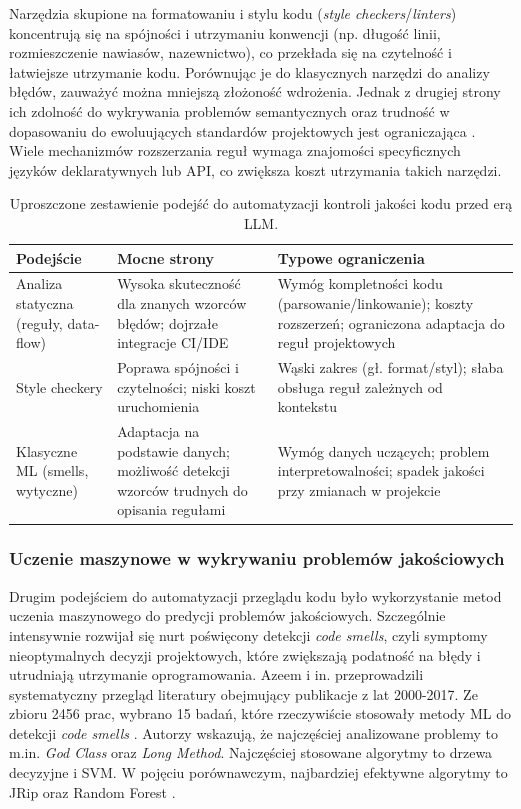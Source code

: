 Narzędzia skupione na formatowaniu i stylu kodu (\textit{style checkers}/\textit{linters}) koncentrują się na
spójności i utrzymaniu konwencji (np. długość linii, rozmieszczenie nawiasów, nazewnictwo), co przekłada się na
czytelność i łatwiejsze utrzymanie kodu. Porównując je do klasycznych narzędzi do analizy błędów, zauważyć można mniejszą
złożoność wdrożenia. Jednak z drugiej strony ich zdolność do wykrywania problemów semantycznych oraz trudność w dopasowaniu
do ewoluujących standardów projektowych jest ograniczająca \cite{Ochodek2020}. Wiele mechanizmów rozszerzania
reguł wymaga znajomości specyficznych języków deklaratywnych lub API, co zwiększa koszt utrzymania takich narzędzi.

\begin{table}[h]
\centering
\caption{Uproszczone zestawienie podejść do automatyzacji kontroli jakości kodu przed erą LLM.}
\label{tab:przed_llm_podejscia}
\begin{tabular}{p{3.4cm} p{5.2cm} p{5.2cm}}
\hline
\textbf{Podejście} & \textbf{Mocne strony} & \textbf{Typowe ograniczenia} \\
\hline
Analiza statyczna (reguły, data-flow) & Wysoka skuteczność dla znanych wzorców błędów; dojrzałe integracje CI/IDE
& Wymóg kompletności kodu (parsowanie/linkowanie); koszty rozszerzeń; ograniczona adaptacja do reguł projektowych \\
\hline
Style checkery & Poprawa spójności i czytelności; niski koszt uruchomienia & Wąski zakres (gł. format/styl);
słaba obsługa reguł zależnych od kontekstu \\
\hline
Klasyczne ML (smells, wytyczne) & Adaptacja na podstawie danych; możliwość detekcji wzorców trudnych do opisania
regułami & Wymóg danych uczących; problem interpretowalności; spadek jakości przy zmianach w projekcie \\
\hline
\end{tabular}
\end{table}

\subsubsection{Uczenie maszynowe w wykrywaniu problemów jakościowych}
Drugim podejściem do automatyzacji przeglądu kodu było wykorzystanie metod uczenia maszynowego do predycji problemów
jakościowych. Szczególnie intensywnie rozwijał się nurt poświęcony detekcji \textit{code smells}, czyli symptomy
nieoptymalnych decyzji projektowych, które zwiększają podatność na błędy i utrudniają utrzymanie oprogramowania.
Azeem i in. przeprowadzili systematyczny przegląd literatury obejmujący publikacje z lat 2000-2017.
Ze zbioru 2456 prac, wybrano 15 badań, które rzeczywiście stosowały metody ML do detekcji \textit{code smells} \cite{Azeem2019}.
Autorzy wskazują, że najczęściej analizowane problemy to m.in. \textit{God Class} oraz \textit{Long Method}.
Najczęściej stosowane algorytmy to drzewa decyzyjne i SVM. W pojęciu porównawczym, najbardziej efektywne algorytmy to
JRip oraz Random Forest \cite{Azeem2019}.

